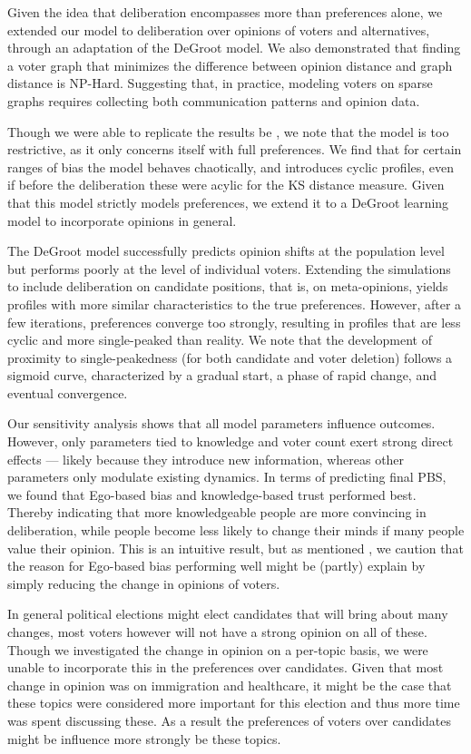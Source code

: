 Given the idea that  deliberation encompasses more than preferences alone, we
extended our model to deliberation over opinions of voters and alternatives,
through an adaptation of the DeGroot model. We also demonstrated that finding a
voter graph that minimizes the difference between opinion distance and graph
distance is NP-Hard. Suggesting that, in practice, modeling voters on sparse
graphs requires collecting both communication patterns and opinion data. 

Though we were able to replicate the results be
\citet{radDeliberationSinglePeakednessCoherent2021}, we note that the model is
too restrictive, as it only concerns itself with full preferences. We find that
for certain ranges of bias the model behaves chaotically, and introduces cyclic
profiles, even if before the deliberation these were acylic for the KS distance
measure. Given that this model strictly models preferences, we extend it to a 
DeGroot learning model to incorporate opinions in general.

The DeGroot model successfully predicts opinion shifts at the population level
but performs poorly at the level of individual voters. Extending the
simulations to include deliberation on candidate positions, that is, on
meta-opinions, yields profiles with more similar characteristics to the true
preferences. However, after a few iterations, preferences converge too
strongly, resulting in profiles that are less cyclic and more single-peaked
than reality. We note that the development of proximity to single-peakedness
(for both candidate and voter deletion) follows a sigmoid curve, characterized
by a gradual start, a phase of rapid change, and eventual convergence.

Our sensitivity analysis shows that all model parameters influence outcomes.
However, only parameters tied to knowledge and voter count exert strong direct
effects — likely because they introduce new information, whereas other
parameters only modulate existing dynamics. In terms of predicting final PBS,
we found that Ego-based bias and knowledge-based trust performed best. Thereby
indicating that more knowledgeable people are more convincing in deliberation,
while people become less likely to change their minds if many people value
their opinion. This is an intuitive result, but as mentioned
, we caution that the reason for Ego-based bias
performing well might be (partly) explain by simply reducing the change in
opinions of voters.

In general political elections might elect candidates that will bring about
many changes, most voters however will not have a strong opinion on all of
these. Though we investigated the change in opinion on a per-topic basis, 
we were unable to incorporate this in the preferences over candidates. Given
that most change in opinion was on immigration and healthcare, it might be
the case that these topics were considered more important for this election
and thus more time was spent discussing these. As a result the preferences 
of voters over candidates might be influence more strongly be these topics. 

